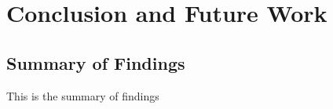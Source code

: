 \chapter{Conclusion and Future Work}

\section{Summary of Findings}

This is the summary of findings
